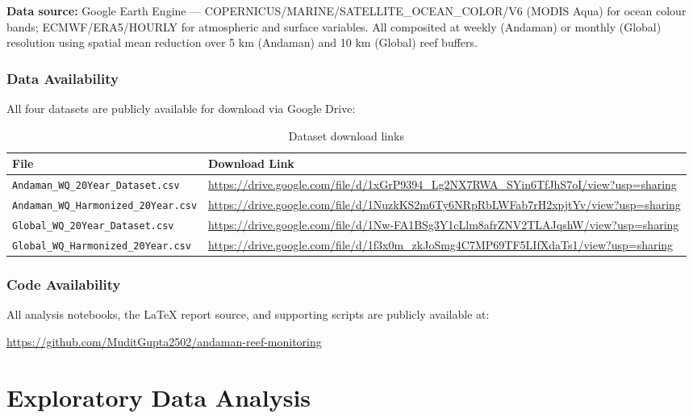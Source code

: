 \documentclass[12pt,a4paper]{report}
\begin{document}
\textbf{Data source:} Google Earth Engine — COPERNICUS/MARINE/SATELLITE\_OCEAN\_COLOR/V6
(MODIS Aqua) for ocean colour bands; ECMWF/ERA5/HOURLY for atmospheric and
surface variables. All composited at weekly (Andaman) or monthly (Global) resolution
using spatial mean reduction over 5 km (Andaman) and 10 km (Global) reef buffers.

\subsection*{Data Availability}

All four datasets are publicly available for download via Google Drive:

\begin{table}[H]
\centering
\caption{Dataset download links}
\begin{tabular}{L{5cm}L{9cm}}
\toprule
\textbf{File} & \textbf{Download Link} \\
\midrule
{}
\texttt{Andaman\_WQ\_20Year\_Dataset.csv} &
  \url{https://drive.google.com/file/d/1xGrP9394_Lg2NX7RWA_SYin6TfJhS7oI/view?usp=sharing} \\
\texttt{Andaman\_WQ\_Harmonized\_20Year.csv} &
  \url{https://drive.google.com/file/d/1NuzkKS2m6Ty6NRpRbLWFab7rH2xpjtYv/view?usp=sharing} \\
\texttt{Global\_WQ\_20Year\_Dataset.csv} &
  \url{https://drive.google.com/file/d/1Nw-FA1BSg3Y1cLlm8afrZNV2TLAJqshW/view?usp=sharing} \\
\texttt{Global\_WQ\_Harmonized\_20Year.csv} &
  \url{https://drive.google.com/file/d/1f3x0m_zkJoSmg4C7MP69TF5LIfXdaTs1/view?usp=sharing} \\
\bottomrule
\end{tabular}
\label{tab:dataset_links}
\end{table}

\subsection*{Code Availability}

All analysis notebooks, the LaTeX report source, and supporting scripts are
publicly available at:

\begin{center}
  \url{https://github.com/MuditGupta2502/andaman-reef-monitoring}
\end{center}

\chapter{Exploratory Data Analysis}
\end{document}
